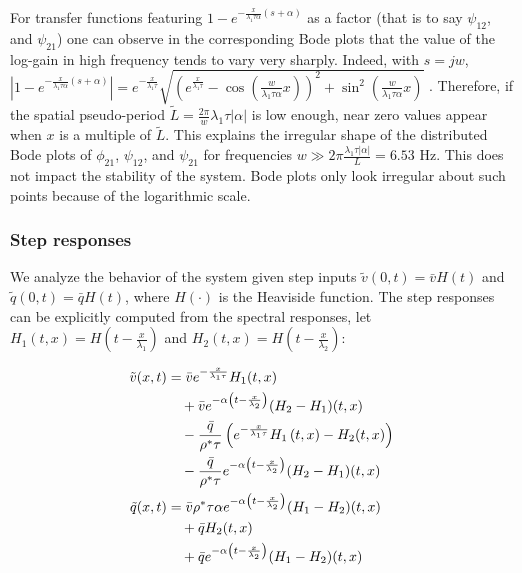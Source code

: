 \documentclass[a4paper, 10pt, conference]{ieeeconf}      %
\begin{document}
For transfer functions featuring {\footnotesize$1 - e^{-\frac{x}{\lambda_{1} \tau \alpha} \left(s + \alpha \right)}$} as a factor (that is to say $\psi_{12}$, and $\psi_{21}$) one can observe in the corresponding Bode plots that the value of the log-gain in high frequency tends to vary very sharply. Indeed, with $s = jw$,
{\footnotesize
$
\left| 
	1 - e^{-\frac{x}{\lambda_{1} \tau \alpha} \left(s + \alpha\right)}
\right| = 
e^{-\frac{x}{\lambda_{1} \tau}}
\sqrt{
	\left(
		e^{\frac{x}{\lambda_{1}\tau}} 
		-
		\cos\left(\frac{w}{\lambda_{1} \tau \alpha} x\right)
	\right)^{2}
	+
	\sin^{2}\left( \frac{w}{\lambda_{1} \tau \alpha} x \right)
}
$
}. Therefore, if the spatial pseudo-period {\footnotesize$\tilde{L}=\frac{2\pi}{w} \lambda_{1} \tau \left|\alpha\right|$} is low enough, near zero values appear when $x$ is a multiple of $\tilde{L}$. This explains the irregular shape of the distributed Bode plots of $\phi_{21}$, $\psi_{12}$, and $\psi_{21}$ for frequencies {\footnotesize$w \gg 2 \pi \frac{\lambda_{1} \tau \left|\alpha\right|}{L} = 6.53$} Hz. This does not impact the stability of the system. Bode plots only look irregular about such points because of the logarithmic scale.\\

\subsubsection{Step responses}
We analyze the behavior of the system given step inputs {\footnotesize$\tilde{v}(0,t)=\bar{v}H(t)$} and {\footnotesize$\tilde{q}(0,t)=\bar{q}H(t)$}, where $H(\cdot)$ is the Heaviside function. The step responses can be explicitly computed from the spectral responses, let {\footnotesize$H_1(t,x) = H\left(t-\frac{x}{\lambda_{1}}\right)$} and
{\footnotesize$H_2(t,x) = H\left(t - \frac{x}{\lambda_{2}} \right)$}:

{\footnotesize
\begin{align}
\tilde{v}(x,t) &= 
\bar{v}
e^{-\frac{x}{\lambda_{1}\tau}}H_1(t,x)
\notag\\
&\quad
+\bar{v}
e^{-\alpha \left(t - \frac{x}{\lambda_{2}} \right)}
	(H_2 - H_1)(t,x)
\notag \\
&\quad
- \dfrac{\bar{q}}{\rho^* \tau}
\left(
	e^{-\frac{x}{\lambda_{1}\tau}}H_1\left(t,x\right) 
	- H_2(t,x)
\right) 
\notag\\
&\quad
- \dfrac{\bar{q}}{\rho^* \tau} e^{-\alpha \left(t - \frac{x}{\lambda_{2}} \right)}
	(H_2 - H_1)(t,x)\\
\tilde{q}(x,t) &= \bar{v} \rho^*\tau \alpha e^{-\alpha \left(t - \frac{x}{\lambda_{2}} \right)}
	(H_1 - H_2)(t,x)
\notag \\
&\quad+ 
\bar{q}
H_2(t,x)
\notag\\
&\quad
+
\bar{q}
e^{-\alpha \left(t - \frac{x}{\lambda_{2}} \right)}
	(H_1 - H_2)(t,x)	
\end{align}
}
\end{document}
